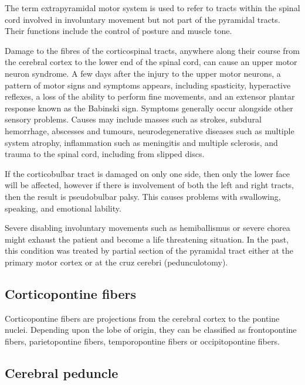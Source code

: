 The term extrapyramidal motor system is used to refer to tracts within the spinal cord involved in involuntary movement but not part of the pyramidal tracts. Their functions include the control of posture and muscle tone.

Damage to the fibres of the corticospinal tracts, anywhere along their course from the cerebral cortex to the lower end of the spinal cord, can cause an upper motor neuron syndrome. A few days after the injury to the upper motor neurons, a pattern of motor signs and symptoms appears, including spasticity, hyperactive reflexes, a loss of the ability to perform fine movements, and an extensor plantar response known as the Babinski sign. Symptoms generally occur alongside other sensory problems. Causes may include masses such as strokes, subdural hemorrhage, abscesses and tumours, neurodegenerative diseases such as multiple system atrophy, inflammation such as meningitis and multiple sclerosis, and trauma to the spinal cord, including from slipped discs.

If the corticobulbar tract is damaged on only one side, then only the lower face will be affected, however if there is involvement of both the left and right tracts, then the result is pseudobulbar palsy. This causes problems with swallowing, speaking, and emotional lability.

Severe disabling involuntary movements such as hemiballismus or severe chorea might exhaust the patient and become a life threatening situation. In the past, this condition was treated by partial section of the pyramidal tract either at the primary motor cortex or at the cruz cerebri (pedunculotomy).

\hypertarget{corticopontine-fibers}{%
\subsection{Corticopontine fibers}\label{corticopontine-fibers}}

Corticopontine fibers are projections from the cerebral cortex to the pontine nuclei. Depending upon the lobe of origin, they can be classified as frontopontine fibers, parietopontine fibers, temporopontine fibers or occipitopontine fibers.

\hypertarget{cerebral-peduncle}{%
\subsection{Cerebral peduncle}\label{cerebral-peduncle}}


